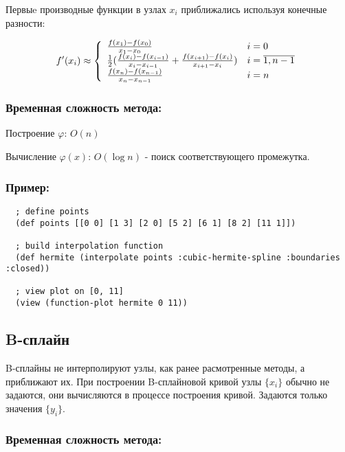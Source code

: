 \noindent Первыe производные функции в узлах $x_i$ приближались используя конечные разности:

\begin{equation}
  f'(x_i) \approx \left\{
  \begin{array}{l l}
    \frac{f(x_1) - f(x_0)}{x_1 - x_0} & i = 0 \\
    \frac{1}{2}(\frac{f(x_i) - f(x_{i-1})}{x_i - x_{i-1}} + \frac{f(x_{i+1}) - f(x_i)}{x_{i+1} - x_i}) & i = \overline{1, n-1} \\
    \frac{f(x_n) - f(x_{n-1})}{x_n - x_{n-1}} & i = n
  \end{array}
  \right.
\end{equation}

\subsubsection{Временная сложность метода:}

Построение $\varphi$: $O(n)$

Вычисление $\varphi(x)$: $O(\log n)$ - поиск соответствующего промежутка.

\subsubsection{Пример:}

\begin{verbatim}
  ; define points
  (def points [[0 0] [1 3] [2 0] [5 2] [6 1] [8 2] [11 1]])

  ; build interpolation function
  (def hermite (interpolate points :cubic-hermite-spline :boundaries :closed))

  ; view plot on [0, 11]
  (view (function-plot hermite 0 11))
\end{verbatim}



\subsection{B-сплайн}

B-сплайны не интерполируют узлы, как ранее расмотренные методы, а приближают их. При построении B-сплайновой кривой узлы $\{x_i\}$ обычно не задаются, они вычисляются в процессе построения кривой. Задаются только значения $\{y_i\}$.

\subsubsection{Временная сложность метода:}

